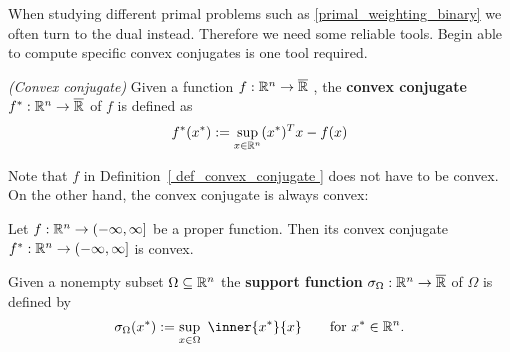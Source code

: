 When studying different primal problems such as \eqref{primal_weighting_binary} we often turn to the dual instead.
Therefore we need some reliable tools.
Begin able to compute specific convex conjugates is one tool required.


\begin{definition}
  \label{ def_convex_conjugate }
  \emph{(Convex conjugate)}
  Given a function
  $
    f:
    \mathbb{R}^n \to \overline{\mathbb{R}}
  $
  ,
  the 
  \textbf{convex conjugate}
  $
    f^*:
    \mathbb{R}^n \to \overline{\mathbb{R}}
  $
  of $f$ is defined as
  \begin{gather}
    f^*(x^*)
    :=
    \sup_{ x \in \mathbb{R}^n }
    (x^*)^T x - f(x)
  \end{gather}
\end{definition}

Note that $f$ in Definition~\ref{ def_convex_conjugate }
does not have to be convex. On the other hand, the convex conjugate is always convex:

\begin{proposition}
  Let  
  $
    f:
    \mathbb{R}^n \to ( - \infty, \infty ]
  $
  be a proper function. 
  Then its convex conjugate
  $
    f^*:
    \mathbb{R}^n \to ( - \infty, \infty ]
  $
  is convex.
\end{proposition}

\begin{definition}
  Given a nonempty subset 
  $\Omega \subseteq \mathbb{R}^n$
  the \textbf{support function} 
  $
  \sigma_\Omega : \mathbb{R}^n \to \overline{\mathbb{R}}
  $
  of $\Omega$
  is defined by
  \begin{gather}
    \sigma_\Omega
    (x^*)
    :=
    \sup_{x \in \Omega}
    \ 
    \inner{x^*}{x}
    \qquad
    \text{for}\ 
    x^* \in \R^n
    .
  \end{gather}
\end{definition}

